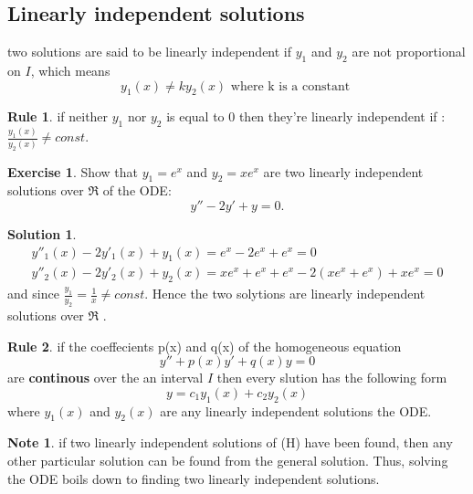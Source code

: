 \documentclass[11pt]{article}
\theoremstyle{definition}
\newtheorem{reg}{Rule}
\newtheorem{exer}{Exercise}
\newtheorem{sln}{Solution}
\newtheorem{note}{Note}
\begin{document}
\subsection{Linearly independent solutions}
two solutions are said to be linearly independent if $y_1$ and $y_2$ are not proportional on $I$, which means
\begin{equation}
    y_1(x) \neq ky_2(x) \text{ where k is a constant }
\end{equation}
\begin{reg}
if neither $y_1$ nor $y_2$ is equal to 0 then they're linearly independent if : $\frac{y_1(x)}{y_2(x)} \neq  const.$
\end{reg}
\begin{exer}

Show that $y_1 = e^x$ and $y_2 = xe^x$ are two linearly independent solutions over $\Re$ of the ODE:
\begin{equation}
    y'' - 2y' + y = 0.
\end{equation}
\end{exer}
\begin{sln}
\begin{equation}
\begin{split}
    y''_1(x) -2y'_1(x) + y_1(x) = e^x -2e^x+e^x = 0\\
    y''_2(x) -2y'_2(x) + y_2(x) = xe^x+e^x+e^x - 2(xe^x+e^x) +xe^x = 0
    \end{split}
\end{equation}
and since $\frac{y_1}{y_2} = \frac{
1}{x} \neq const.$ Hence the two solytions are linearly independent solutions over $\Re$ .
\end{sln}
\begin{reg}
if the coeffecients p(x) and q(x) of the homogeneous equation 
\begin{equation}
    y''+p(x)y'+q(x)y=0
\end{equation}
are \textbf{continous} over the an interval $I$ then every slution has the following form 
\begin{equation}
    y = c_1 y_1(x)+c_2 y_2(x) 
\end{equation}
where $y_1(x)$ and $y_2(x)$ are any linearly independent solutions the ODE.
\end{reg}
\begin{note}
if two linearly independent solutions of (H)
have been found, then any other particular solution can be found from the general solution. Thus, solving the ODE boils down to finding two linearly independent solutions.
\end{note}
\end{document}
